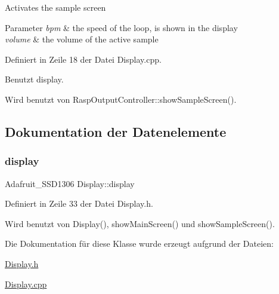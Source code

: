 Activates the sample screen 
\begin{DoxyParams}{Parameter}
{\em bpm} & the speed of the loop, is shown in the display \\
\hline
{\em volume} & the volume of the active sample \\
\hline
\end{DoxyParams}


Definiert in Zeile 18 der Datei Display.\+cpp.



Benutzt display.



Wird benutzt von Rasp\+Output\+Controller\+::show\+Sample\+Screen().



\subsection{Dokumentation der Datenelemente}
\mbox{\label{class_display_ad8b8ca65d118eb16461932c6630463a1}} 
\subsubsection{\texorpdfstring{display}{display}}
{\footnotesize\ttfamily Adafruit\+\_\+\+S\+S\+D1306 Display\+::display\hspace{0.3cm}{\ttfamily [private]}}



Definiert in Zeile 33 der Datei Display.\+h.



Wird benutzt von Display(), show\+Main\+Screen() und show\+Sample\+Screen().



Die Dokumentation für diese Klasse wurde erzeugt aufgrund der Dateien\+:\begin{DoxyCompactItemize}
\item 
\hyperlink{_display_8h}{Display.\+h}\item 
\hyperlink{_display_8cpp}{Display.\+cpp}\end{DoxyCompactItemize}
